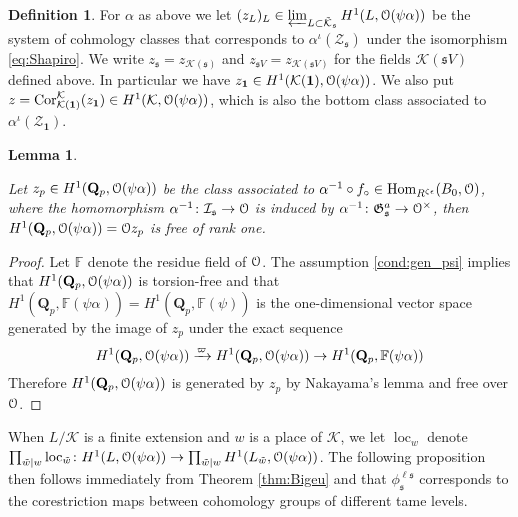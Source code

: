 \documentclass[leqno]{amsart}
\newtheorem{lem}[thm]{Lemma}
\theoremstyle{definition}
\newtheorem{defn}[thm]{Definition}
\theoremstyle{remark}
\newcommand{\id}{\mathbf{1}}
\newcommand{\eo}{\EuScript{O}}
\newcommand{\fF}{\mathbb{F}} %
\newcommand{\Qp}{\mathbf{Q}_p}
\DeclareMathOperator{\Hom}{Hom}
\DeclareMathOperator{\Cor}{Cor}
\newcommand{\fs}{\mathfrak{s}}
\newcommand{\K}{{\mathcal{K}}} %
\newcommand{\fG}{\mathfrak{G}}
\newcommand{\I}{\mathcal{I}} %
\DeclareMathOperator{\loc}{loc}
\begin{document}
\begin{defn}

For $\alpha$ as above we let  
$(z_L)_L\in \varprojlim_{L\subset \tilde{\K}_\fs}
H^1(L, \eo(\psi\alpha))$
be the system of cohmology classes that corresponds to 
$\alpha^\iota(\mathcal{Z}_\fs)$
under the isomorphism \eqref{eq:Shapiro}.
We write $z_\fs=z_{\K(\fs)}$ and
$z_{\fs V}=z_{\K(\fs V)}$ 
for the fields $\K(\fs V)$ defined above.
In particular we have  
$z_{\id}\in H^1(\K(\id), \eo(\psi\alpha))$.
We also put 
$z=\Cor_{\K(\id)}^{\K}(z_\id)\in H^1(\K, \eo(\psi\alpha))$,
which is also the bottom class associated to 
$\alpha^\iota(\mathcal{Z}_\id)$.

\end{defn}



\begin{lem}\label{lem:classp}

Let $z_p\in H^1(\Qp, \eo(\psi\alpha))$
be the class associated to 
$\alpha^{-1}\circ f_\circ\in \Hom_{R^{\zeta\epsilon}}(B_0, \eo)$,
where the homomorphism 
$\alpha^{-1}\colon \I_\fs\to \eo$ is induced by 
$\alpha^{-1}\colon \fG_\fs^a\to \eo^\times$, 
then $H^1(\Qp, \eo(\psi\alpha))=\eo z_p$
is free of rank one.
\end{lem}
\begin{proof}

Let $\fF$ denote the residue field of $\eo$.
The assumption \eqref{cond:gen_psi}
implies that 
$H^1(\Qp, \eo(\psi\alpha))$ is torsion-free and that
$H^1(\Qp, \fF(\psi\alpha))=H^1(\Qp, \fF(\psi))$
is the one-dimensional vector space generated by 
the image of $z_p$ under the exact sequence
\[
    H^1(\Qp, \eo(\psi\alpha))\xrightarrow{\varpi}
    H^1(\Qp, \eo(\psi\alpha))\to
    H^1(\Qp, \fF(\psi\alpha))
\]
Therefore $H^1(\Qp, \eo(\psi\alpha))$
is generated by $z_p$ by Nakayama's lemma
and free over $\eo$.

\end{proof}


When $L/\K$ is a finite extension and $w$ is a place of $\K$,
we let $\loc_w$ denote
$\prod_{\tilde{w}\mid w}\loc_{\tilde{w}}\colon 
H^1(L, \eo(\psi\alpha))\to 
\prod_{\tilde{w}\mid w}H^1(L_{\tilde{w}}, \eo(\psi\alpha))$.
The following proposition then follows immediately
from Theorem \ref{thm:Bigeu}
and that $\phi^{\ell\fs}_\fs$
corresponds to the corestriction maps
between cohomology groups of different tame levels.
\end{document}

